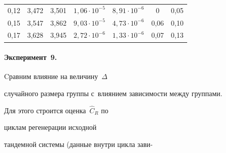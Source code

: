 \begin{table}[h]
\begin{center}
\begin{tabular}{|c|c|c|c|c|c|c|}


0,12& 3,472 & 3,501& $ 1{,}06 \cdot 10^{-5} $& $8{,}91 \cdot 10^{-6}$ &  0\hphantom{9}& 0,05  \\




0,15& 3,547 & 3,862& $ 9{,}03 \cdot 10^{-5} $& $4{,}73 \cdot 10^{-6}$ &\hphantom{$-$}0,06& 0,10  \\




0,17& 3,628 & 3,945& $ 2{,}72 \cdot 10^{-6} $& $1{,}33 \cdot 10^{-6}$ &\hphantom{$-$}0,07 & 0,13 \\


\hline


\end{tabular}


\end{center}


\vspace*{-6pt}


\end{table}























\vspace*{-6pt}





\paragraph*{Эксперимент~9.}


Cравним влияние  на величину~$\Delta$


 случайного  размера группы   с~влиянием зависимости между  группами.


Для этого строится  оценка~$\hat{C}_R$ по


 циклам  регенерации исходной 


тандемной системы (данные внутри цикла зави-\linebreak\vspace*{-12pt}





